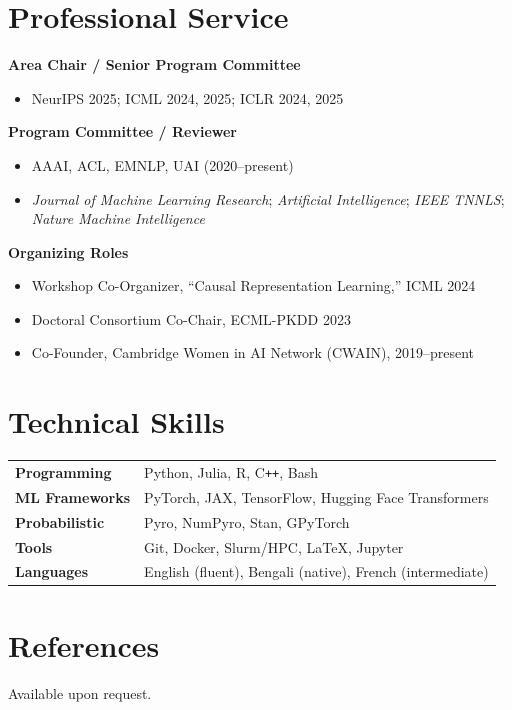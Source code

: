 \documentclass[a4paper,11pt]{article}
\begin{document}
\section{Professional Service}

\textbf{Area Chair / Senior Program Committee}

\begin{itemize}[leftmargin=1.4em, itemsep=1pt, topsep=2pt]
  \item NeurIPS 2025; ICML 2024, 2025; ICLR 2024, 2025
\end{itemize}

\vspace{4pt}
\textbf{Program Committee / Reviewer}

\begin{itemize}[leftmargin=1.4em, itemsep=1pt, topsep=2pt]
  \item AAAI, ACL, EMNLP, UAI (2020--present)
  \item \textit{Journal of Machine Learning Research}; \textit{Artificial Intelligence};
        \textit{IEEE TNNLS}; \textit{Nature Machine Intelligence}
\end{itemize}

\vspace{4pt}
\textbf{Organizing Roles}

\begin{itemize}[leftmargin=1.4em, itemsep=1pt, topsep=2pt]
  \item Workshop Co-Organizer, ``Causal Representation Learning,'' ICML 2024
  \item Doctoral Consortium Co-Chair, ECML-PKDD 2023
  \item Co-Founder, Cambridge Women in AI Network (CWAIN), 2019--present
\end{itemize}

\section{Technical Skills}

\begin{tabularx}{\linewidth}{@{}>{\bfseries}p{3.6cm}X@{}}
  Programming    & Python, Julia, R, C\texttt{++}, Bash \\[2pt]
  ML Frameworks  & PyTorch, JAX, TensorFlow, Hugging Face Transformers \\[2pt]
  Probabilistic  & Pyro, NumPyro, Stan, GPyTorch \\[2pt]
  Tools          & Git, Docker, Slurm/HPC, \LaTeX, Jupyter \\[2pt]
  Languages      & English (fluent), Bengali (native), French (intermediate) \\
\end{tabularx}

\section{References}

Available upon request.
\end{document}

